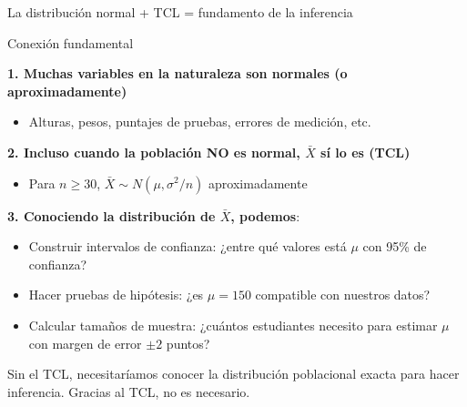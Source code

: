 \documentclass[aspectratio=169, 11pt]{beamer}
\begin{document}
\begin{frame}{La distribución normal + TCL = fundamento de la inferencia}
\begin{alertblock}{Conexión fundamental}
\end{alertblock}

\textbf{1. Muchas variables en la naturaleza son normales (o aproximadamente)}
\begin{itemize}
\item Alturas, pesos, puntajes de pruebas, errores de medición, etc.
\end{itemize}

\textbf{2. Incluso cuando la población NO es normal, $\bar{X}$ sí lo es (TCL)}
\begin{itemize}
\item Para $n \geq 30$, $\bar{X} \sim N(\mu, \sigma^2/n)$ aproximadamente
\end{itemize}

\textbf{3. Conociendo la distribución de $\bar{X}$, podemos}:
\begin{itemize}
\item Construir \alert{intervalos de confianza}: ¿entre qué valores está $\mu$ con 95\% de confianza?
\item Hacer \alert{pruebas de hipótesis}: ¿es $\mu = 150$ compatible con nuestros datos?
\item Calcular \alert{tamaños de muestra}: ¿cuántos estudiantes necesito para estimar $\mu$ con margen de error $\pm 2$ puntos?
\end{itemize}

\vspace{0.5em}
\alert{Sin el TCL, necesitaríamos conocer la distribución poblacional exacta para hacer inferencia. Gracias al TCL, no es necesario.}
\end{frame}
\end{document}
